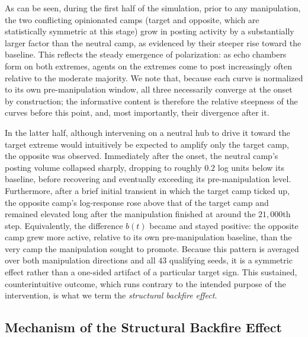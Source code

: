 \documentclass[pdflatex,sn-mathphys-num]{sn-jnl}%
\theoremstyle{thmstyleone}%
\theoremstyle{thmstyletwo}%
\theoremstyle{thmstylethree}%
\begin{document}
\par

As can be seen, during the first half of the simulation, prior
to any manipulation, the two conflicting opinionated camps (target and opposite,
which are statistically symmetric at this stage) grow in posting
activity by a substantially larger factor than the neutral camp,
as evidenced by their steeper rise toward the baseline.
This reflects the steady emergence of polarization: as echo chambers
form on both extremes, agents on the extremes come to post increasingly
often relative to the moderate majority. We note that, because each
curve is normalized to its own pre-manipulation window,
all three necessarily converge at the onset by construction;
the informative content is therefore the relative steepness
of the curves before this point, and, most importantly, their
divergence after it.
\par

In the latter half, although intervening on a neutral hub to drive
it toward the target extreme would intuitively be expected to
amplify only the target camp, the opposite was observed.
Immediately after the onset, the neutral camp's posting volume
collapsed sharply, dropping to roughly $0.2$ log units below its baseline,
before recovering and eventually exceeding its pre-manipulation level. Furthermore, after a brief
initial transient in which the target camp ticked up,
the opposite camp's log-response rose above that of the
target camp and remained elevated long after the manipulation
finished at around the $21{,}000$th step. Equivalently,
the difference $b(t)$
became and stayed positive: the opposite camp grew
more active, relative to its own pre-manipulation baseline,
than the very camp the manipulation sought to promote.
Because this pattern is averaged over both manipulation
directions and all $43$ qualifying seeds, it is a symmetric
effect rather than a one-sided artifact of a particular target sign.
This sustained, counterintuitive outcome, which runs contrary to the
intended purpose of the intervention, is what we
term the \emph{structural backfire effect}.
\par

\subsection{Mechanism of the Structural Backfire Effect}\label{backfire_mechanism}
\end{document}
